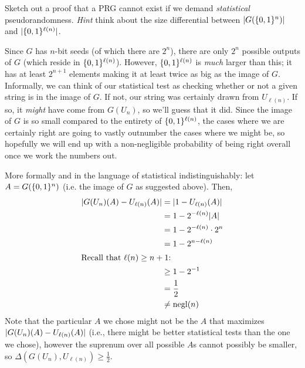 \documentclass[11pt]{article}
\begin{document}
\begin{question}
    Sketch out a proof that a PRG cannot exist if we demand \emph{statistical}
    pseudorandomness. \emph{Hint} think about the size differential between
    $\lvert G(\{0,1\}^n)\rvert$ and $\lvert\{0,1\}^{\ell(n)}\rvert$.
\end{question}
\begin{answer}
    Since $G$ has $n$-bit seeds (of which there are $2^n$), there are only $2^n$
    possible outputs of $G$ (which reside in $\{0,1\}^{\ell(n)}$). However, $\{0,1\}^{\ell(n)}$ is
    \emph{much} larger than this; it has at least $2^{n+1}$ elements making it at
    least twice as big as the image of \(G\). Informally, we
    can think of our statistical test as checking whether or not a given string is in
    the image of $G$. If not, our string was certainly drawn from $U_{\ell(n)}$. If
    so, it \emph{might} have come from $G(U_n)$, so we'll guess that it did. Since the image of $G$ is so small
    compared to the entirety of $\{0,1\}^{\ell(n)}$, the cases where we are
    certainly right are going to vastly outnumber the cases where we might be, so
    hopefully we will end up with a non-negligible probability of being right overall
    once we work the numbers out.

    \noindent More formally and in the language of statistical indistinguishably: let
    $A = G(\{0,1\}^n)$ (i.e. the image of $G$ as suggested above). Then,
    \begin{align*}
        \lvert G(U_n)(A) - U_{\ell(n)}(A)\rvert &= \lvert1 - U_{\ell(n)}(A)\rvert \\
                                         &= 1 - 2^{-\ell(n)}\lvert A\rvert \\
                                         &= 1 - 2^{-\ell(n)}\cdot 2^n \\
                                         &= 1 - 2^{n - \ell(n)} \\
        \intertext{Recall that $\ell(n) \geq n + 1$:}
                                         &\geq 1 - 2^{-1} \\
                                         &= \frac{1}{2} \\
                                         &\neq \operatorname{negl}(n)
    \end{align*}
    Note that the particular $A$ we chose might not be the $A$ that maximizes
    $\lvert G(U_n)(A) - U_{\ell(n)}(A)\rvert$ (i.e., there might be better statistical
    tests than the one we chose), however the suprenum over all possible $A$s cannot
    possibly be smaller, so $\Delta(G(U_n), U_{\ell(n)}) \geq \frac{1}{2}$.
\end{answer}
  
\end{document}

